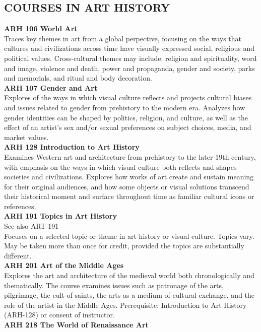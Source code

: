 \documentclass[
  letterpaper,
]{scrbook}
\begin{document}
\subsection{COURSES IN ART HISTORY}\label{sec-courses-in-art-history}

\textbf{ARH 106 World Art}\\
Traces key themes in art from a global perpective, focusing on the ways
that cultures and civilizations across time have visually expressed
social, religious and political values. Cross-cultural themes may
include: religion and spirituality, word and image, violence and death,
power and propaganda, gender and society, parks and memorials, and
ritual and body decoration.\\
\textbf{ARH 107 Gender and Art}\\
Explores of the ways in which visual culture reflects and projects
cultural biases and issues related to gender from prehistory to the
modern era. Analyzes how gender identities can be shaped by politics,
religion, and culture, as well as the effect of an artist's sex and/or
sexual preferences on subject choices, media, and market values.\\
\textbf{ARH 128 Introduction to Art History}\\
Examines Western art and architecture from prehistory to the later 19th
century, with emphasis on the ways in which visual culture both reflects
and shapes societies and civilizations. Explores how works of art create
and sustain meaning for their original audiences, and how some objects
or visual solutions transcend their historical moment and surface
throughout time as familiar cultural icons or references.\\
\textbf{ARH 191 Topics in Art History}\\
See also ART 191\\
Focuses on a selected topic or theme in art history or visual culture.
Topics vary. May be taken more than once for credit, provided the topics
are substantially different.\\
\textbf{ARH 201 Art of the Middle Ages}\\
Explores the art and architecture of the medieval world both
chronologically and thematically. The course examines issues such as
patronage of the arts, pilgrimage, the cult of saints, the arts as a
medium of cultural exchange, and the role of the artist in the Middle
Ages. Prerequisite: Introduction to Art History (ARH-128) or consent of
instructor.\\
\textbf{ARH 218 The World of Renaissance Art}\\
\end{document}
